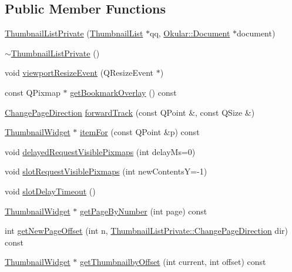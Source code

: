 \subsection*{Public Member Functions}
\begin{DoxyCompactItemize}
\item 
\hyperlink{classThumbnailListPrivate_a52f30cc118648ad56a13aeb364f067aa}{Thumbnail\+List\+Private} (\hyperlink{classThumbnailList}{Thumbnail\+List} $\ast$qq, \hyperlink{classOkular_1_1Document}{Okular\+::\+Document} $\ast$document)
\item 
\hyperlink{classThumbnailListPrivate_a836c987b5cd5d0655bb07966c314c5be}{$\sim$\+Thumbnail\+List\+Private} ()
\item 
void \hyperlink{classThumbnailListPrivate_a50ec7d81dbde95a64c239c8b39aed7e9}{viewport\+Resize\+Event} (Q\+Resize\+Event $\ast$)
\item 
const Q\+Pixmap $\ast$ \hyperlink{classThumbnailListPrivate_a59584e41b70ff2e4f72b95eef939cec2}{get\+Bookmark\+Overlay} () const 
\item 
\hyperlink{classThumbnailListPrivate_a28316c5b42c24bc9ab372f8e978406a4}{Change\+Page\+Direction} \hyperlink{classThumbnailListPrivate_a5cdc36425c0fb964d31cdeff1d645f13}{forward\+Track} (const Q\+Point \&, const Q\+Size \&)
\item 
\hyperlink{classThumbnailWidget}{Thumbnail\+Widget} $\ast$ \hyperlink{classThumbnailListPrivate_aa6c59ee38d152b0f0fd8e1c0883b1418}{item\+For} (const Q\+Point \&p) const 
\item 
void \hyperlink{classThumbnailListPrivate_a830ad4ac20c8f6d4d8f9cb09def53510}{delayed\+Request\+Visible\+Pixmaps} (int delay\+Ms=0)
\item 
void \hyperlink{classThumbnailListPrivate_aea63d745e73446fb0d5a25ed5c9bb9e1}{slot\+Request\+Visible\+Pixmaps} (int new\+Contents\+Y=-\/1)
\item 
void \hyperlink{classThumbnailListPrivate_a83a13bad00831983432c728faff581bb}{slot\+Delay\+Timeout} ()
\item 
\hyperlink{classThumbnailWidget}{Thumbnail\+Widget} $\ast$ \hyperlink{classThumbnailListPrivate_a418e2cdc581a80762739e6d2f1ab3658}{get\+Page\+By\+Number} (int page) const 
\item 
int \hyperlink{classThumbnailListPrivate_a26baa0dbb6546005f9e1de713f35558f}{get\+New\+Page\+Offset} (int n, \hyperlink{classThumbnailListPrivate_a28316c5b42c24bc9ab372f8e978406a4}{Thumbnail\+List\+Private\+::\+Change\+Page\+Direction} dir) const 
\item 
\hyperlink{classThumbnailWidget}{Thumbnail\+Widget} $\ast$ \hyperlink{classThumbnailListPrivate_a41e4c88ca1858ad631704d323817c444}{get\+Thumbnailby\+Offset} (int current, int offset) const 
\end{DoxyCompactItemize}
